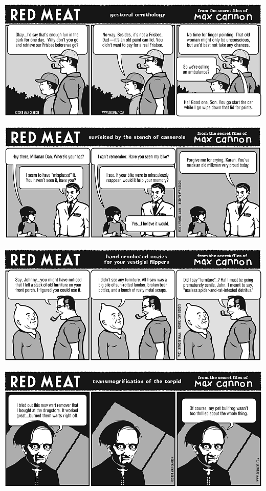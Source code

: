 \documentclass[a4paper,twoside,11pt]{article}
\begin{document}
\includegraphics[width=\textwidth]{redmeat_2008-07-29.png}



\includegraphics[width=\textwidth]{redmeat_2008-08-05.png}



\includegraphics[width=\textwidth]{redmeat_2008-08-12.png}



\includegraphics[width=\textwidth]{redmeat_2008-08-19.png}
\end{document}
